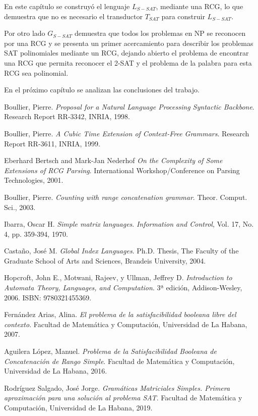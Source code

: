 \documentclass[12pt]{article}
\begin{document}
En este capítulo se construyó el lenguaje $L_{S-SAT}$, mediante una RCG, lo que demuestra que no es necesario el transductor $T_{SAT}$ para construir $L_{S-SAT}$.

Por otro lado $G_{S-SAT}$ demuestra que todos los problemas en NP se reconocen por una RCG y se presenta un primer acercamiento para describir los problemas SAT polinomiales mediante un RCG, dejando abierto el problema de encontrar una RCG que permita reconocer el 2-SAT y el problema de la palabra para esta RCG sea polinomial.

En el próximo capítulo se analizan las conclusiones del trabajo.

\begin{thebibliography}{99}
    
    Boullier, Pierre.
    \textit{Proposal for a Natural Language Processing Syntactic Backbone}.
    Research Report RR-3342, INRIA, 1998.
    
    Boullier, Pierre.
    \textit{A Cubic Time Extension of Context-Free Grammars}.
    Research Report RR-3611, INRIA, 1999.
    
    Eberhard Bertsch and Mark-Jan Nederhof
    \textit{On the Complexity of Some Extensions of RCG Parsing}.
    International Workshop/Conference on Parsing Technologies, 2001.
    
    Boullier, Pierre.
    \textit{Counting with range concatenation grammar}.
    Theor. Comput. Sci., 2003.
    
    Ibarra, Oscar H.
    \textit{Simple matrix languages}.
    \textit{Information and Control}, Vol. 17, No. 4, pp. 359-394, 1970.
    
    Castaño, José M.
    \textit{Global Index Languages}.
    Ph.D. Thesis, The Faculty of the Graduate School of Arts and Sciences, Brandeis University, 2004.
    
    Hopcroft, John E., Motwani, Rajeev, y Ullman, Jeffrey D.
    \textit{Introduction to Automata Theory, Languages, and Computation}.
    3ª edición, Addison-Wesley, 2006. ISBN: 9780321455369.
    
    Fernández Arias, Alina.
    \textit{El problema de la satisfacibilidad booleana libre del contexto}.
    Facultad de Matemática y Computación, Universidad de La Habana, 2007.
    
    Aguilera López, Manuel.
    \textit{Problema de la Satisfacibilidad Booleana de Concatenación de Rango Simple}.
    Facultad de Matemática y Computación, Universidad de La Habana, 2016.
    
    Rodríguez Salgado, José Jorge.
    \textit{Gramáticas Matriciales Simples. Primera aproximación para una solución al problema SAT}.
    Facultad de Matemática y Computación, Universidad de La Habana, 2019.
    
\end{thebibliography}
\end{document}
